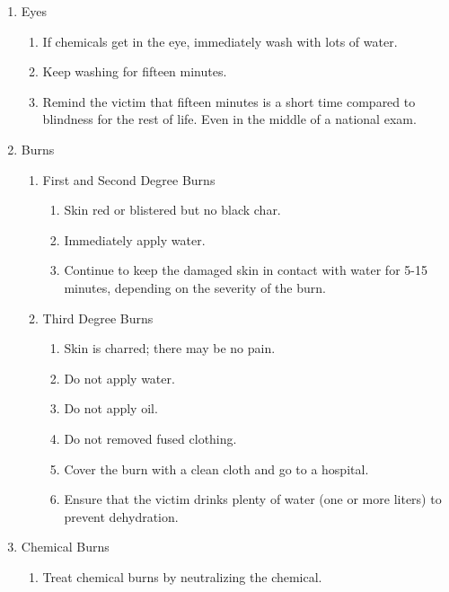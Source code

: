 \begin{enumerate}
\begin{enumerate}
\begin{enumerate}
{remember to put something (gloves, a plastic bag, etc.) 
between your skin and their blood.}
\item{If the cut is deep (might require stitches) seek medical attention. 
Make sure that the doctor sees how deep the wound really is -- 
you might do such a good job cleaning the cut 
that the doctor will not understand how serious it is.}
\end{enumerate}
\item{Eyes}
\begin{enumerate}
\item{If chemicals get in the eye, immediately wash with lots of water.}
\item{Keep washing for fifteen minutes.}
\item{Remind the victim that fifteen minutes is a short time 
compared to blindness for the rest of life. 
Even in the middle of a national exam.}
\end{enumerate}
\item{Burns}
\begin{enumerate}
\item{First and Second Degree Burns}
\begin{enumerate}
\item{Skin red or blistered but no black char.}
\item{Immediately apply water.}
\item{Continue to keep the damaged skin in contact with water for 5-15 minutes, 
depending on the severity of the burn.}
\end{enumerate}
\item{Third Degree Burns}
\begin{enumerate}
\item{Skin is charred; there may be no pain.}
\item{Do not apply water.}
\item{Do not apply oil.}
\item{Do not removed fused clothing.}
\item{Cover the burn with a clean cloth and go to a hospital.}
\item{Ensure that the victim drinks plenty of water (one or more liters) 
to prevent dehydration.}
\end{enumerate}
\end{enumerate}
\item{Chemical Burns}
\begin{enumerate}
\item{Treat chemical burns by neutralizing the chemical.}
\begin{enumerate}

\end{enumerate}
\end{enumerate}
\end{enumerate}
\end{enumerate}
